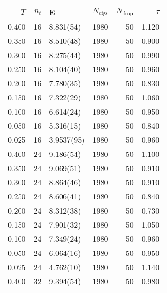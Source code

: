 \begin{tabular}{rrlrrr}
\hline
   $T$ &   $n_t$ & E          &   $N_\textrm{cfgs}$ &   $N_\textrm{drop}$ &   $\tau$ \\
\hline
 0.400 &      16 & 8.831(54)  &                1980 &                  50 &    1.120 \\
 0.350 &      16 & 8.510(48)  &                1980 &                  50 &    0.900 \\
 0.300 &      16 & 8.275(44)  &                1980 &                  50 &    0.990 \\
 0.250 &      16 & 8.104(40)  &                1980 &                  50 &    0.960 \\
 0.200 &      16 & 7.780(35)  &                1980 &                  50 &    0.830 \\
 0.150 &      16 & 7.322(29)  &                1980 &                  50 &    1.060 \\
 0.100 &      16 & 6.614(24)  &                1980 &                  50 &    0.950 \\
 0.050 &      16 & 5.316(15)  &                1980 &                  50 &    0.840 \\
 0.025 &      16 & 3.9537(95) &                1980 &                  50 &    0.960 \\
 0.400 &      24 & 9.186(54)  &                1980 &                  50 &    1.100 \\
 0.350 &      24 & 9.069(51)  &                1980 &                  50 &    0.910 \\
 0.300 &      24 & 8.864(46)  &                1980 &                  50 &    0.910 \\
 0.250 &      24 & 8.606(41)  &                1980 &                  50 &    0.840 \\
 0.200 &      24 & 8.312(38)  &                1980 &                  50 &    0.730 \\
 0.150 &      24 & 7.901(32)  &                1980 &                  50 &    1.050 \\
 0.100 &      24 & 7.349(24)  &                1980 &                  50 &    0.960 \\
 0.050 &      24 & 6.064(16)  &                1980 &                  50 &    0.950 \\
 0.025 &      24 & 4.762(10)  &                1980 &                  50 &    1.140 \\
 0.400 &      32 & 9.394(54)  &                1980 &                  50 &    0.980 \\

\end{tabular}
